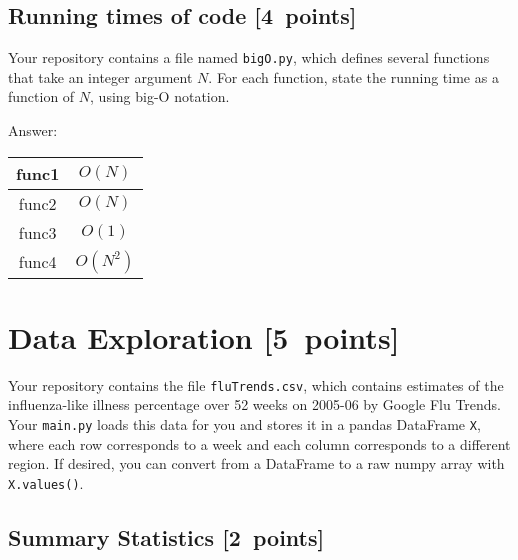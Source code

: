 \documentclass{article}
\newcommand{\blu}[1]{{\textcolor{blu}{#1}}}
\newenvironment{answer}{\par\begingroup\color{gre}Answer: }{\endgroup}
\let\ask\blu
\newcommand\pts[1]{\textcolor{pointscolour}{[#1~points]}}
\begin{document}
  \subsection{Running times of code \pts{4}}

  Your repository contains a file named \texttt{bigO.py}, which defines several functions
  that take an integer argument $N$. For each function, \ask{state the running time as a function of $N$, using big-O notation}.
  \begin{answer}
     \begin{tabular}{ |c| c| }
          \hline
          func1 & $O(N)$ \\ 
          \hline
          func2 & $O(N)$  \\  
          \hline
          func3 & $O(1)$ \\ 
          \hline
          func4 & $O(N^2)$ \\ 
          \hline
         \end{tabular}   
  \end{answer}


  \clearpage\section{Data Exploration \pts{5}}


  Your repository contains the file \texttt{fluTrends.csv}, which contains estimates
  of the influenza-like illness percentage over 52 weeks on 2005-06 by Google Flu Trends.
  Your \texttt{main.py} loads this data for you and stores it in a pandas DataFrame \texttt{X},
  where each row corresponds to a week and each column
  corresponds to a different
  region. If desired, you can convert from a DataFrame to a raw numpy array with \texttt{X.values()}.

  \subsection{Summary Statistics \pts{2}}
\end{document}

